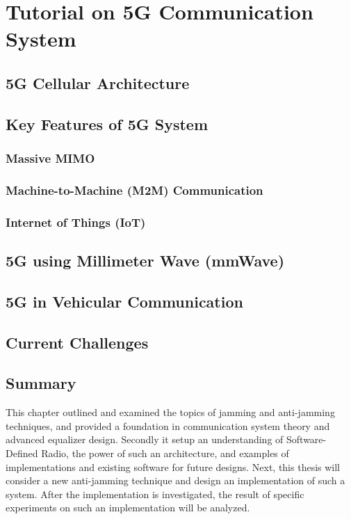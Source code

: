 \chapter{Tutorial on 5G Communication System}
\label{chapter2}
\section{5G Cellular Architecture}

\section{Key Features of 5G System}
\subsection{Massive MIMO}
\subsection{Machine-to-Machine (M2M) Communication}
\subsection{Internet of Things (IoT)}

\section{5G using Millimeter Wave (mmWave)}

\section{5G in Vehicular Communication}

\section{Current Challenges}

\section{Summary}
This chapter outlined and examined the topics of jamming and anti-jamming techniques, and provided a foundation in communication system theory and advanced equalizer design.  Secondly it setup an understanding of Software-Defined Radio, the power of such an architecture, and examples of implementations and existing software for future designs.  Next, this thesis will consider a new anti-jamming technique and design an implementation of such a system.  After the implementation is investigated, the result of specific experiments on such an implementation will be analyzed.\\
